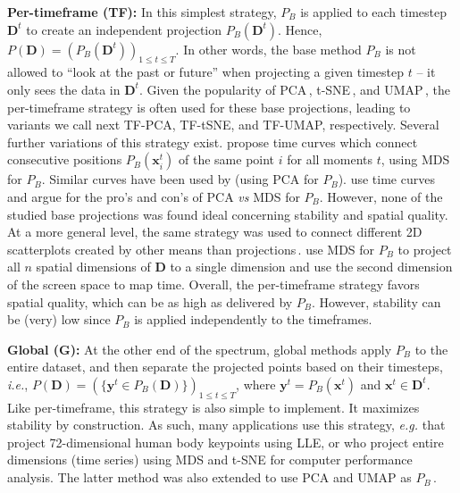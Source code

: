 
\noindent\textbf{Per-timeframe (TF):} 
In this simplest strategy, $P_B$ is applied to each timestep $\mathbf{D}^t$ to create an independent projection $P_B(\mathbf{D}^t)$. Hence, $P(\mathbf{D}) = ( P_B(\mathbf{D}^t))_{ 1 \leq t \leq T}$. In other words, the base method $P_B$ is not allowed to ``look at the past or future'' when projecting a given timestep $t$ -- it only sees the data in $\mathbf{D}^t$. Given the popularity of PCA\,\citep{pca}, t-SNE\,\citep{vanderMaaten2008}, and UMAP\,\citep{umap}, the per-timeframe strategy is often used for these base projections, leading to variants we call next TF-PCA, TF-tSNE, and TF-UMAP, respectively. Several further variations of this strategy exist. \cite{bsk16} propose time curves which connect consecutive positions $P_B(\mathbf{x}_i^t)$ of the same point $i$ for all moments $t$, using MDS for $P_B$. Similar curves have been used by \cite{bws12} (using PCA for $P_B$). \cite{Brich2020} use time curves and argue for the pro's and con's of PCA \emph{vs} MDS for $P_B$. However, none of the studied base projections was found ideal concerning stability and spatial quality. At a more general level, the same strategy was used to connect different 2D scatterplots created by other means than projections\,\citep{hkf16}. \cite{Jackle2016} use MDS for $P_B$ to project all $n$ spatial dimensions of $\mathbf{D}$ to a single dimension and use the second dimension of the screen space to map time. 
Overall, the per-timeframe strategy favors spatial quality, which can be as high as delivered by $P_B$. However, stability can be (very) low since $P_B$ is applied independently to the timeframes. 

\noindent\textbf{Global (G):}
At the other end of the spectrum, global methods apply $P_B$ to the entire dataset, and then separate the projected points based on their timesteps, \emph{i.e.}, $P(\mathbf{D}) = (\{\mathbf{y}^t \in P_B(\mathbf{D})\})_{1 \leq t \leq T}$, where $\mathbf{y}^t = P_B(\mathbf{x}^t)$ and $\mathbf{x}^t \in \mathbf{D}^t$. Like per-timeframe, this strategy is also simple to implement. It maximizes stability by construction. As such, many applications use this strategy, \emph{e.g.} \cite{Hu2010} that project 72-dimensional human body keypoints using LLE, or \cite{Fujiwara2018} who project entire dimensions (time series) using MDS and t-SNE for computer performance analysis. The latter method was also extended to use PCA and UMAP as $P_B$\,\citep{Fujiwara2020}.

